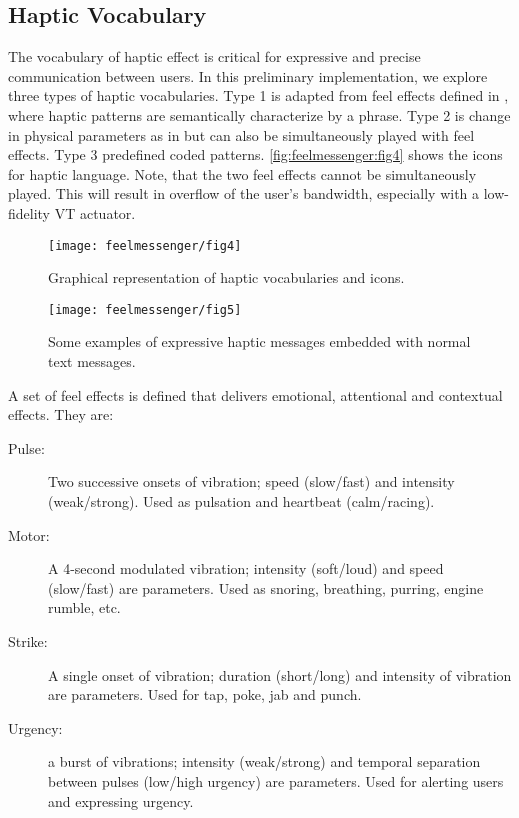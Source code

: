 \subsection{Haptic Vocabulary}
The vocabulary of haptic effect is critical for expressive and precise communication between users. In this preliminary implementation, we explore three types of haptic vocabularies. Type 1 is adapted from feel effects defined in \cite{Israr2014}, where haptic patterns are semantically characterize by a phrase. Type 2 is change in physical parameters as in \cite{Brewster2004,MacLean2003} but can also be simultaneously played with feel effects. Type 3  predefined coded patterns.
\autoref{fig:feelmessenger:fig4} shows the icons for haptic language. Note, that the two feel effects cannot be simultaneously played. This will result in overflow of the user's bandwidth, especially with a low-fidelity VT actuator.


\begin{figure}[htbp] %
   \centering
   \texttt{[image: feelmessenger/fig4]} 
   \caption{Graphical representation of haptic vocabularies and icons.}
   \label{fig:feelmessenger:fig4}
\end{figure}


\begin{figure}[htbp] %
   \centering
   \texttt{[image: feelmessenger/fig5]} 
   \caption{Some examples of expressive haptic messages embedded with normal text messages.}
   \label{fig:feelmessenger:fig5}
\end{figure}


A set of feel effects is defined that delivers emotional, attentional and contextual effects. They are:
\begin{description}
	\item[Pulse:] Two successive onsets of vibration; speed (slow/fast) and intensity (weak/strong). Used as pulsation and heartbeat (calm/racing).
	\item[Motor:] A 4-second modulated vibration; intensity (soft/loud) and speed (slow/fast) are parameters. Used as snoring, breathing, purring, engine rumble, etc.
	\item[Strike:] A single onset of vibration; duration (short/long) and intensity of vibration are parameters. Used for tap, poke, jab and punch.
	\item[Urgency:] a burst of vibrations; intensity (weak/strong) and temporal separation between pulses (low/high urgency) are parameters. Used for alerting users and expressing urgency.
\end{description}

